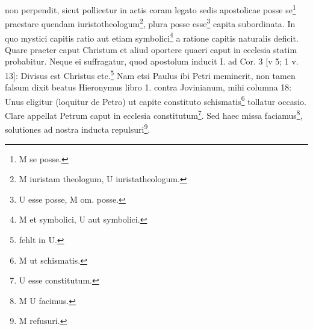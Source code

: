 non perpendit, sicut pollicetur in actis coram legato sedis apostolicae posse se\footnote{M se posse.} praestare quendam iuristotheologum\footnote{M iuristam theologum, U iuristatheologum.}, plura posse esse\footnote{U esse posse, M om. posse.} capita subordinata. In quo mystici capitis ratio aut etiam symbolici\footnote{M et symbolici, U aut symbolici.} a ratione capitis naturalis deficit. Quare praeter caput Christum et aliud oportere quaeri caput in ecclesia statim probabitur. Neque ei suffragatur, quod apostolum inducit I. ad Cor. 3 [v 5; 1 v. 13]: Divisus est Christus etc.\footnote{fehlt in U.} Nam etsi Paulus ibi Petri meminerit, non tamen falsum dixit beatus Hieronymus libro 1. contra Jovinianum, mihi columna 18: Unus eligitur (loquitur de Petro) ut capite constituto schismatis\footnote{M ut schismatis.} tollatur occasio. Clare appellat Petrum caput in ecclesia constitutum\footnote{U esse constitutum.}. Sed haec missa faciamus\footnote{M U facimus.}, solutiones ad nostra inducta repulsuri\footnote{M refusuri.}.


